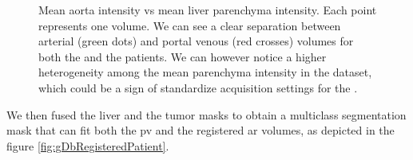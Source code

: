 {\begin{figure}[!ht]
\begin{mdframed}[backgroundcolor=blue!50,linecolor=blue!50]
		\caption{Mean aorta intensity vs mean liver parenchyma intensity. Each point represents one volume. We can see a clear separation between arterial (green dots) and portal venous (red crosses) volumes for both the \textbf{} and the \textbf{} patients. We can however notice a higher heterogeneity among the mean parenchyma intensity in the \textbf{} dataset, which could be a sign of standardize acquisition settings for the \textbf{}.
		}
		\label{fig:gdbAortaPlot}
	\end{mdframed}
\end{figure}
}
We then fused the liver and the tumor masks to obtain a multiclass
segmentation mask that can fit both the \ac{pv} and the registered \ac{ar} volumes, as depicted in the figure \ref{fig:gDbRegisteredPatient}.

